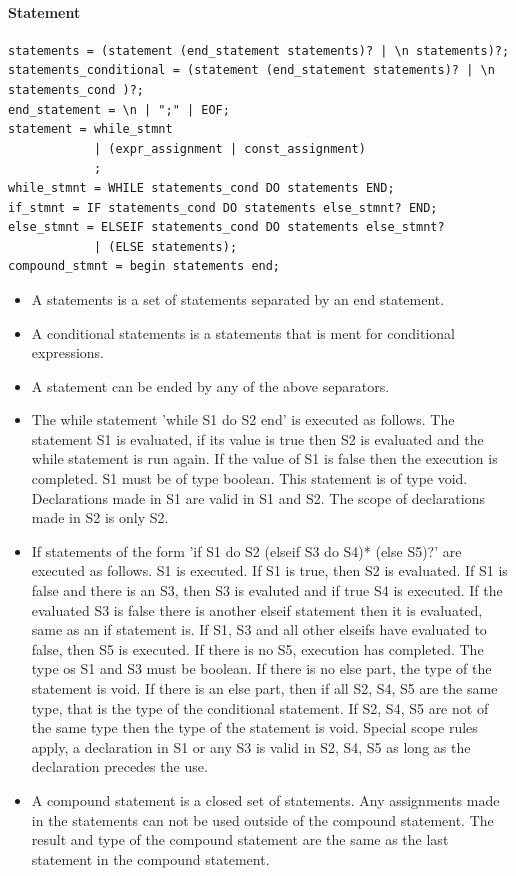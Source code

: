 \documentclass[paper=a4, fontsize=11pt]{article}
\numberwithin{equation}{section}		%
\numberwithin{figure}{section}			%
\numberwithin{table}{section}				%
\begin{document}
\paragraph{Statement}
\begin{verbatim}
statements = (statement (end_statement statements)? | \n statements)?;
statements_conditional = (statement (end_statement statements)? | \n statements_cond )?;
end_statement = \n | ";" | EOF;
statement = while_stmnt 
			| (expr_assignment | const_assignment) 
			;
while_stmnt = WHILE statements_cond DO statements END;
if_stmnt = IF statements_cond DO statements else_stmnt? END;
else_stmnt = ELSEIF statements_cond DO statements else_stmnt?
			| (ELSE statements);
compound_stmnt = begin statements end;
\end{verbatim}
\begin{itemize}
\item A statements is a set of statements separated by an end statement.
\item A conditional statements is a statements that is ment for conditional expressions.
\item A statement can be ended by any of the above separators.
\item The while statement 'while S1 do S2 end' is executed as follows. The statement S1 is evaluated, if its value is true then S2 is evaluated and the while statement is run again. If the value of S1 is false then the execution is completed. S1 must be of type boolean. This statement is of type void. Declarations made in S1 are valid in S1 and S2. The scope of declarations made in S2 is only S2.

\item If statements of the form 'if S1 do S2 (elseif S3 do S4)* (else S5)?' are executed as follows. S1 is executed. If S1 is true, then S2 is evaluated. If S1 is false and there is an S3, then S3 is evaluted and if true S4 is executed. If the evaluated S3 is false there is another elseif statement then it is evaluated, same as an if statement is. If S1, S3 and all other elseifs have evaluated to false, then S5 is executed. If there is no S5, execution has completed. The type os S1 and S3 must be boolean. If there is no else part, the type of the statement is void. If there is an else part, then if all S2, S4, S5 are the same type, that is the type of the conditional statement. If S2, S4, S5 are not of the same type then the type of the statement is void. Special scope rules apply, a declaration in S1 or any S3 is valid in S2, S4, S5 as long as the declaration precedes the use. 
\item A compound statement is a closed set of statements. Any assignments made in the statements can not be used outside of the compound statement. The result and type of the compound statement are the same as the last statement in the compound statement.

\end{itemize}
\end{document}
